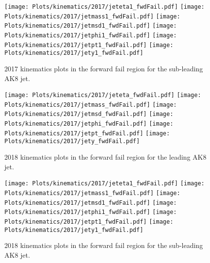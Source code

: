 \begin{figure}[htp]
	\begin{center}

		\texttt{[image: Plots/kinematics/2017/jeteta1\_fwdFail.pdf]}
		\texttt{[image: Plots/kinematics/2017/jetmass1\_fwdFail.pdf]}
		\texttt{[image: Plots/kinematics/2017/jetmsd1\_fwdFail.pdf]}
		\texttt{[image: Plots/kinematics/2017/jetphi1\_fwdFail.pdf]}
		\texttt{[image: Plots/kinematics/2017/jetpt1\_fwdFail.pdf]}
		\texttt{[image: Plots/kinematics/2017/jety1\_fwdFail.pdf]}

		\caption{2017 kinematics plots in the forward fail region for the sub-leading AK8 jet.}
		\label{fig:kin2017_fwdFail1}
	\end{center}
\end{figure}



\begin{figure}[htp]
	\begin{center}
		
		\texttt{[image: Plots/kinematics/2017/jeteta\_fwdFail.pdf]}
		\texttt{[image: Plots/kinematics/2017/jetmass\_fwdFail.pdf]}
		\texttt{[image: Plots/kinematics/2017/jetmsd\_fwdFail.pdf]}
		\texttt{[image: Plots/kinematics/2017/jetphi\_fwdFail.pdf]}
		\texttt{[image: Plots/kinematics/2017/jetpt\_fwdFail.pdf]}
		\texttt{[image: Plots/kinematics/2017/jety\_fwdFail.pdf]}
		
		\caption{2018 kinematics plots in the forward fail region for the leading AK8 jet.}
		\label{fig:kin2018_fwdFail}
	\end{center}
\end{figure}



\begin{figure}[htp]
	\begin{center}

		\texttt{[image: Plots/kinematics/2017/jeteta1\_fwdFail.pdf]}
		\texttt{[image: Plots/kinematics/2017/jetmass1\_fwdFail.pdf]}
		\texttt{[image: Plots/kinematics/2017/jetmsd1\_fwdFail.pdf]}
		\texttt{[image: Plots/kinematics/2017/jetphi1\_fwdFail.pdf]}
		\texttt{[image: Plots/kinematics/2017/jetpt1\_fwdFail.pdf]}
		\texttt{[image: Plots/kinematics/2017/jety1\_fwdFail.pdf]}

		\caption{2018 kinematics plots in the forward fail region for the sub-leading AK8 jet.}
		\label{fig:kin2018_fwdFail1}
	\end{center}
\end{figure}



